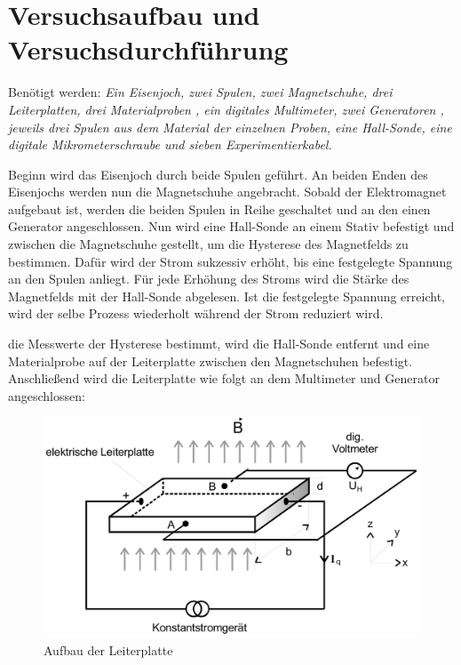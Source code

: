 \section{Versuchsaufbau und Versuchsdurchführung} \label{sec:4}\justifying
Benötigt werden: \textit{Ein Eisenjoch, zwei Spulen, zwei Magnetschuhe, drei Leiterplatten, drei Materialproben , 
ein digitales Multimeter, zwei Generatoren , jeweils drei Spulen aus dem Material der einzelnen Proben,
eine Hall-Sonde, eine digitale Mikrometerschraube
und sieben Experimentierkabel.}

\justifying Beginn wird das Eisenjoch durch beide Spulen geführt. An beiden Enden des Eisenjochs werden nun die Magnetschuhe
angebracht. Sobald der Elektromagnet aufgebaut ist, werden die beiden Spulen in Reihe geschaltet und an den einen Generator angeschlossen. Nun wird eine Hall-Sonde an einem Stativ befestigt und zwischen die Magnetschuhe gestellt, um
die Hysterese des Magnetfelds zu bestimmen. Dafür wird der Strom sukzessiv erhöht, bis eine festgelegte Spannung an den Spulen anliegt. Für jede Erhöhung des Stroms wird die Stärke
des Magnetfelds mit der Hall-Sonde abgelesen. Ist die festgelegte Spannung erreicht, wird der selbe Prozess wiederholt während der Strom reduziert
wird. 

\justifying die Messwerte der Hysterese bestimmt, wird die Hall-Sonde entfernt und eine Materialprobe auf der 
Leiterplatte zwischen den Magnetschuhen befestigt. Anschließend wird die Leiterplatte wie folgt an dem Multimeter und Generator angeschlossen:

\begin{figure}[H]
    \centering
    \includegraphics[width=\linewidth]{./images/leiterplatte.jpg}
    \caption{Aufbau der Leiterplatte \cite{V311}}
    \label{fig:1}
\end{figure}

